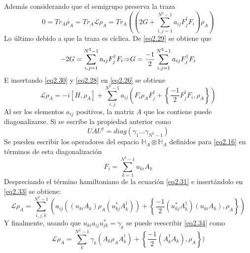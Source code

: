 \documentclass{book}
\begin{document}
Además considerando que el semigrupo preserva la traza
\begin{equation} \label{eq2.29}0=Tr_A\dot{\rho_A}=Tr_A\mathcal{L}\rho_A=Tr_A((2G+\sum_{i,j=1}^{N^2-1}a_{ij}F_j^\dag F_i)\rho_A)\end{equation}
Lo último debido a que la traza es cíclica. De \textcolor{blue}{\ref{eq2.29}} se obtiene que
\begin{equation}\label{eq2.30}-2G=\sum_{i,j=1}^{N^2-1}a_{ij}F_j^\dag F_i \textcolor{red}{\Rightarrow} G=\frac{-1}{2}\sum_{i,j=1}^{N^2-1}a_{ij}F_j^\dag F_i\end{equation}
E insertando \textcolor{blue}{\ref{eq2.30}} y \textcolor{blue}{\ref{eq2.28}} en \textcolor{blue}{\ref{eq2.26}} se obtiene
\begin{equation}\label{eq2.31}\mathcal{L}\rho_A=-i[H,\rho_A]+\sum_{i,j}^{N^2-1}a_{ij}(F_i\rho_AF_j^\dag+\left\{\frac{-1}{2}F_j^\dag F_i,\rho_A\right\})\end{equation}
Al ser los elementos $a_{ij}$ positivos, la matriz $A$ que los contiene puede diagonalizarse. Si se escribe la propiedad anterior como
\begin{equation}\label{eq2.32} UAU^\dag=diag(\gamma_1...\gamma_{N^2-1})\end{equation}
Se pueden escribir los operadores del espacio $\mathbb{H}_A\otimes\mathbb{H}_A$ definidos para \textcolor{blue}{\ref{eq2.16}} en términos de esta diagonalización
\begin{equation}\label{eq2.33} F_i=\sum_{k=1}^{N^2-1}u_{ki}A_k\end{equation} Despreciando el término hamiltoniano de la ecuación \textcolor{blue}{\ref{eq2.31}} e insertándolo en \textcolor{blue}{\ref{eq2.33}} se obtiene:
\begin{equation}\label{eq2.34}\mathcal{L}\rho_A=\sum_{i,j,k}^{N^2-1}( a_{ij}((u_{ki}A_k)\rho_A(u_{kj}^*A_k^\dag))+\left\{\frac{-1}{2}(u_{kj}^*A_k^\dag) (u_{ki}A_k),\rho_A\right\})\end{equation}
Y finalmente, usando que $u_{ki}a_{ij}u_{jk}^*=\gamma_k$ se puede reescribir \textcolor{blue}{\ref{eq2.34}} como 
\begin{equation}\label{eq2.35}\mathcal{L}\rho_A=\sum_k^{N^2-1}\gamma_k(A_k\rho_A A_k^\dag)+\left\{\frac{-1}{2}(A_k^\dag A_k),\rho_A\right\})\end{equation}
\end{document}
